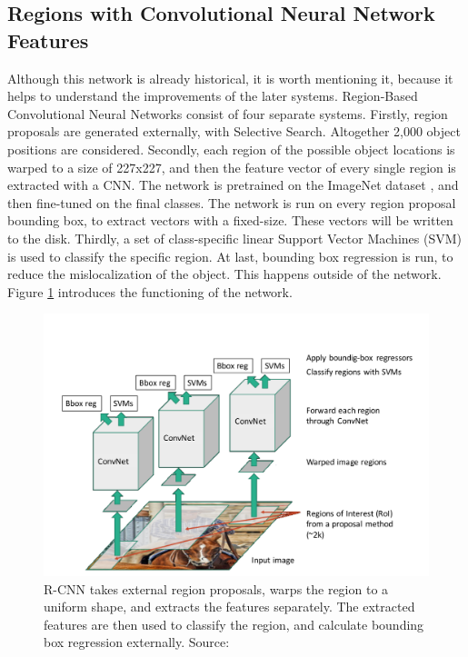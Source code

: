 \subsection{Regions with Convolutional Neural Network Features}
Although this network is already historical, it is worth mentioning it, because it helps to understand the improvements of the later systems. Region-Based Convolutional Neural Networks \cite{DBLP:journals/corr/GirshickDDM13} consist of four separate systems. Firstly, region proposals are generated externally, with Selective Search. Altogether 2,000 object positions are considered. Secondly, each region of the possible object locations is warped to a size of 227x227, and then the feature vector of every single region is extracted with a CNN. The network \cite{NIPS2012_4824} is pretrained on the ImageNet dataset \cite{imagenet_cvpr09}, and then fine-tuned on the final classes. The network is run on every region proposal bounding box, to extract vectors with a fixed-size. These vectors will be written to the disk. Thirdly, a set of class-specific linear Support Vector Machines (SVM) \cite{Cortes:1995:SN:218919.218929} is used to classify the specific region. At last, bounding box regression is run, to reduce the mislocalization of the object. This happens outside of the network. Figure \ref{fig:rcnn} introduces the functioning of the network.
\bigbreak
\begin{figure}[h!]
	\centering
	\includegraphics[width=12cm]{images/mt/rcnn.png}
	\caption{R-CNN takes external region proposals, warps the region to a uniform shape, and extracts the features separately. The extracted features are then used to classify the region, and calculate bounding box regression externally. Source: \cite{Girshick16}}
	\label{fig:rcnn}
\end{figure}
\bigbreak
